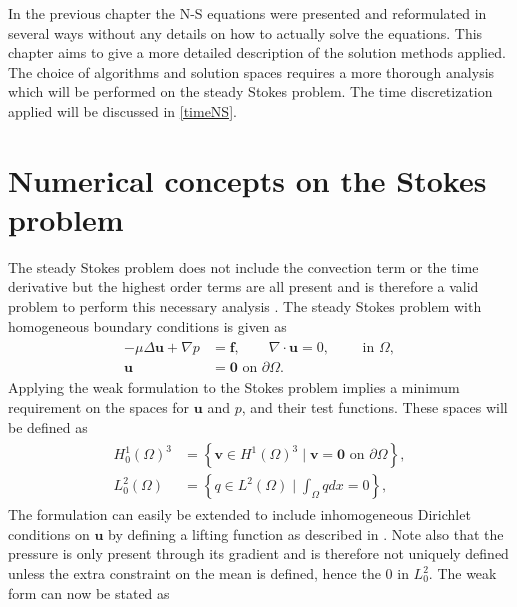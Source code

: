 
In the previous chapter the N-S equations were presented and reformulated in several ways without any details on how to
actually solve the equations. This chapter aims to give a more detailed description of the solution methods applied.
The choice of algorithms and solution spaces requires a more thorough analysis which will be performed on the 
steady Stokes problem. The time discretization applied will be discussed in \cref{timeNS}.


\section{Numerical concepts on the Stokes problem} \label{stokes}
The steady Stokes problem does not include the convection term or the time derivative 
but the highest order terms are all present and is therefore a valid problem to perform this necessary
analysis \cite{Karniadakis}. The steady Stokes problem with homogeneous boundary conditions is given as 
%
\begin{align}
    \begin{split}
        - \mu \Delta \mathbf{u} + \nabla p &= \mathbf{f}, \qquad \nabla \cdot \mathbf{u} = 0, \qquad \text{ in } \Omega, \\
        \mathbf{u} &= \mathbf{0} \text{  on  } \partial \Omega.
    \end{split}
    \label{eq:stokes}
\end{align}
%
Applying the weak formulation to the Stokes problem implies a minimum requirement on the spaces for $\mathbf{u}$ and $p$,
and their test functions. These spaces will be defined as 
%
\begin{align}
    \begin{split}
        H_0^1(\Omega)^{3} &= \left\{ \mathbf{v} \in H^1(\Omega)^{3}\; |
        \; \mathbf{v} = \mathbf{0} \text{  on  } \partial \Omega \right\},\\
    L_0^2(\Omega) &= \left\{ q \in L^2(\Omega)\; |\; \int_{\Omega} q dx = 0 \right\},
    \end{split}
    \label{eq:spaces}
\end{align}
%
The formulation can easily be extended to include inhomogeneous Dirichlet conditions on $\mathbf{u}$ by defining a 
lifting function as described in \cite{Quarteroni}. Note also that the pressure is only present through its gradient 
and is therefore not uniquely defined unless the extra constraint on the mean is defined, hence the $0$ in $L_0^2$. 
The weak form can now be stated as


